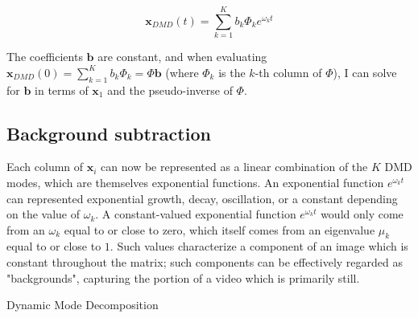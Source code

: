 \documentclass{article}
\begin{document}
\begin{equation}
	\mathbf{x}_{DMD}(t) = \sum_{k=1}^K b_k \Phi_ke^{\omega_k t}
	\label{eqn:approximation}
\end{equation}

The coefficients $\mathbf{b}$ are constant, and when evaluating $\mathbf{x}_{DMD}(0) = \sum_{k=1}^K b_k \Phi_k = \Phi \mathbf{b}$ (where $\Phi_k$ is the $k$-th column of $\Phi$), I can solve for $\mathbf{b}$ in terms of $\mathbf{x}_1$ and the pseudo-inverse of $\Phi$.

\subsection{Background subtraction}

Each column of $\mathbf{x}_i$ can now be represented as a linear combination of the $K$ DMD modes, which are themselves exponential functions. An exponential function $e^{\omega_kt}$ can represented exponential growth, decay, oscillation, or a constant depending on the value of $\omega_k$. A constant-valued exponential function $e^{\omega_kt}$ would only come from an $\omega_k$ equal to or close to zero, which itself comes from an eigenvalue $\mu_k$ equal to or close to $1$. Such values characterize a component of an image which is constant throughout the matrix; such components can be effectively regarded as "backgrounds", capturing the portion of a video which is primarily still. 


\begin{algorithm}[]
	\begin{algorithmic}
		\ENDFOR{}
	\end{algorithmic}
	\label{alg:dmd}
	\caption{Dynamic Mode Decomposition}
\end{algorithm}
\end{document}
